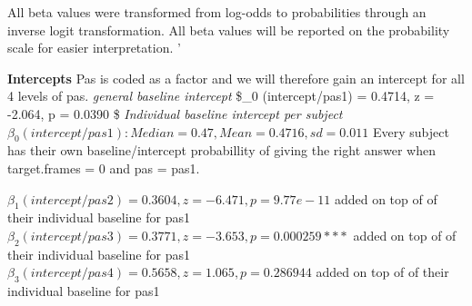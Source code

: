 \documentclass[
]{article}
\newenvironment{Shaded}{\begin{snugshade}}{\end{snugshade}}
\newcommand{\AttributeTok}[1]{\textcolor[rgb]{0.77,0.63,0.00}{#1}}
\newcommand{\ConstantTok}[1]{\textcolor[rgb]{0.00,0.00,0.00}{#1}}
\newcommand{\ControlFlowTok}[1]{\textcolor[rgb]{0.13,0.29,0.53}{\textbf{#1}}}
\newcommand{\DecValTok}[1]{\textcolor[rgb]{0.00,0.00,0.81}{#1}}
\newcommand{\FloatTok}[1]{\textcolor[rgb]{0.00,0.00,0.81}{#1}}
\newcommand{\FunctionTok}[1]{\textcolor[rgb]{0.00,0.00,0.00}{#1}}
\newcommand{\NormalTok}[1]{#1}
\newcommand{\OtherTok}[1]{\textcolor[rgb]{0.56,0.35,0.01}{#1}}
\newcommand{\SpecialCharTok}[1]{\textcolor[rgb]{0.00,0.00,0.00}{#1}}
\begin{document}
\begin{Shaded}
\end{Shaded}

All beta values were transformed from log-odds to probabilities through
an inverse logit transformation. All beta values will be reported on the
probability scale for easier interpretation. '

\textbf{Intercepts} Pas is coded as a factor and we will therefore gain
an intercept for all 4 levels of pas. \emph{general baseline intercept}
\$\beta\_0 (intercept/pas1) = 0.4714, z = -2.064, p = 0.0390 \$
\emph{Individual baseline intercept per subject}
\(\beta_0 (intercept/pas1): Median = 0.47, Mean = 0.4716, sd = 0.011\)
Every subject has their own baseline/intercept probabillity of giving
the right answer when target.frames = 0 and pas = pas1.

\(\beta_1 (intercept/pas2) = 0.3604, z = -6.471, p = 9.77e-11\) added on
top of of their individual baseline for pas1
\(\beta_2 (intercept/pas3) = 0.3771, z = -3.653, p = 0.000259 ***\)
added on top of of their individual baseline for pas1
\(\beta_3 (intercept/pas4) = 0.5658, z = 1.065, p = 0.286944\) added on
top of of their individual baseline for pas1
\end{document}
